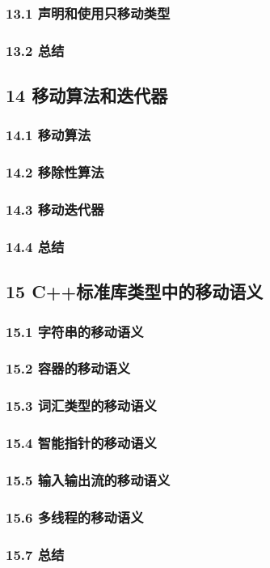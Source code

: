 \documentclass[11pt,a4paper,UTF8]{ctexart}
\begin{document}
		\subsubsection{13.1 声明和使用只移动类型}
		
		\subsubsection{13.2 总结}
		
	\subsection{14 移动算法和迭代器}
	
		\subsubsection{14.1 移动算法}
		
		\subsubsection{14.2 移除性算法}
		
		\subsubsection{14.3 移动迭代器}
		
		\subsubsection{14.4 总结}
		
	\subsection{15 C++标准库类型中的移动语义}
	
		\subsubsection{15.1 字符串的移动语义}
		
		\subsubsection{15.2 容器的移动语义}
		
		\subsubsection{15.3 词汇类型的移动语义}
		
		\subsubsection{15.4 智能指针的移动语义}
		
		\subsubsection{15.5 输入输出流的移动语义}
		
		\subsubsection{15.6 多线程的移动语义}
		
		\subsubsection{15.7 总结}
		
\end{document}
